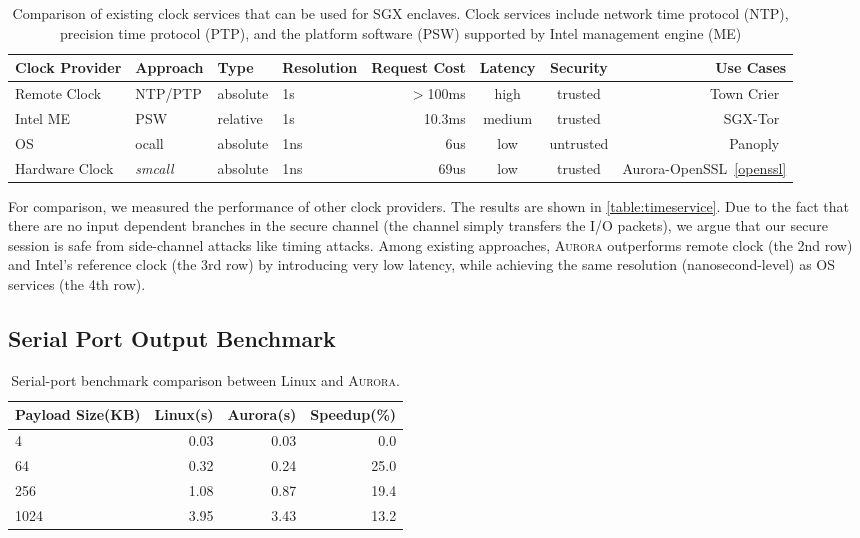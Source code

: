 \begin{table}[t]
	\centering
	\caption{Comparison of existing clock services that can be used for SGX enclaves. Clock services include network time protocol (NTP), precision time protocol (PTP), and the platform software (PSW) supported by Intel management engine (ME)}
	\label{table:timeservice}
	\small
	\begin{tabular}{llllrccr}%
		\toprule
		Clock Provider & Approach & Type & Resolution & Request Cost & Latency & Security & Use Cases \\
		\midrule
		Remote Clock & NTP/PTP & absolute & 1s & $>$100ms & high & trusted & Town Crier~\cite{DBLP:conf/ccs/ZhangCCJS16} \\
		Intel ME & PSW & relative & 1s & 10.3ms & medium & trusted & SGX-Tor~\cite{DBLP:conf/nsdi/KimHHKH17} \\
		OS & ocall & absolute & 1ns & 6us & low & untrusted & Panoply~\cite{shinde_panoply:_2017} \\
		Hardware Clock & \textit{smcall} & absolute & 1ns & 69us & low & trusted & Aurora-OpenSSL~\ref{openssl} \\
		\bottomrule
	\end{tabular}
\end{table}

For comparison, we measured the performance of other clock providers. The results are shown in \autoref{table:timeservice}. Due to the fact that there are no input dependent branches in the secure channel (the channel simply transfers the I/O packets), we argue that our secure session is safe from side-channel attacks like timing attacks. 
Among existing approaches, \textsc{Aurora} outperforms remote clock (the 2nd row) and Intel's reference clock (the 3rd row) by introducing very low latency, while achieving the same resolution (nanosecond-level) as OS services (the 4th row). 

\subsection{Serial Port Output Benchmark}

\begin{table}[h]
	\centering
	\caption{Serial-port benchmark comparison between Linux and \textsc{Aurora}.}
	\label{table:serial}
	\small
	\begin{tabular}{lrrr}
		\toprule
		Payload Size(KB) & Linux(s) & Aurora(s) & Speedup(\%) \\
		\midrule
		4 & 0.03 & 0.03 & 0.0 \\
		64 & 0.32 & 0.24 & 25.0 \\
		256 & 1.08 & 0.87 & 19.4 \\
		1024 & 3.95 & 3.43 & 13.2 \\
		\bottomrule
	\end{tabular}
\end{table}

